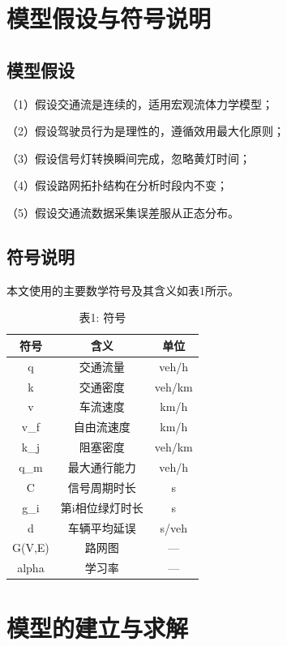 \section{模型假设与符号说明}

\subsection{模型假设}

（1）假设交通流是连续的，适用宏观流体力学模型；

（2）假设驾驶员行为是理性的，遵循效用最大化原则；

（3）假设信号灯转换瞬间完成，忽略黄灯时间；

（4）假设路网拓扑结构在分析时段内不变；

（5）假设交通流数据采集误差服从正态分布。

\subsection{符号说明}

本文使用的主要数学符号及其含义如表1所示。

\begin{table}[H]
  \centering
  \caption{表1: 符号}
  \label{tab:1}
  \begin{tabular}{ccc}
    \toprule
    符号 & 含义 & 单位 \\
    \midrule
    q & 交通流量 & veh/h \\
    k & 交通密度 & veh/km \\
    v & 车流速度 & km/h \\
    v\_f & 自由流速度 & km/h \\
    k\_j & 阻塞密度 & veh/km \\
    q\_m & 最大通行能力 & veh/h \\
    C & 信号周期时长 & s \\
    g\_i & 第i相位绿灯时长 & s \\
    d & 车辆平均延误 & s/veh \\
    G(V,E) & 路网图 & — \\
    alpha & 学习率 & — \\
    \bottomrule
  \end{tabular}
\end{table}

\section{模型的建立与求解}

